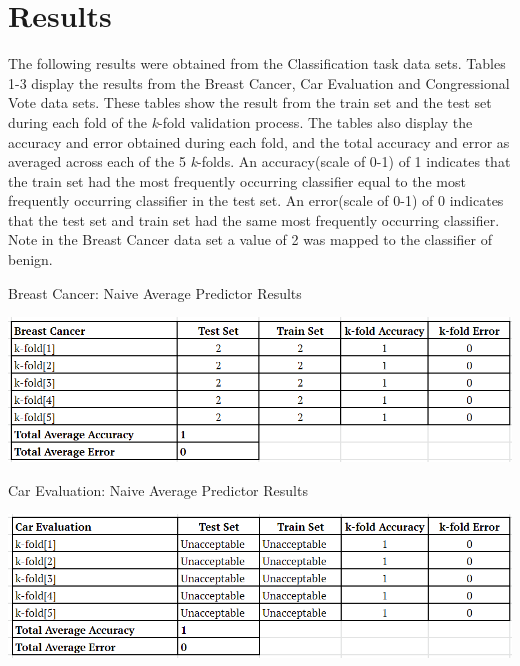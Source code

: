 \documentclass[twoside,11pt]{article}
\begin{document}
\newpage

\section{Results}
The following results were obtained from the Classification task data sets.
Tables 1-3 display the results from the Breast Cancer, Car Evaluation and Congressional Vote data sets. These tables show the result from the train set and the test set during each fold of the \textit{k}-fold validation process. The tables also display the accuracy and error obtained during each fold, and the total accuracy and error as averaged across each of the 5 \textit{k}-folds. An accuracy(scale of 0-1) of 1 indicates that the train set had the most frequently occurring classifier equal to the most frequently occurring classifier in the test set. An error(scale of 0-1) of 0 indicates that the test set and train set had the same most frequently occurring classifier. Note in the Breast Cancer data set a value of 2 was mapped to the classifier of benign.\\ 

\begin{table}[h!]
	\begin{center}
		\caption{Breast Cancer: Naive Average Predictor Results}
		\label{tab:table4}
		\includegraphics[scale=.6]{BC_Results}\newline
	\end{center}
\end{table}

\begin{table}[h!]
	\begin{center}
		\caption{Car Evaluation: Naive Average Predictor Results}
		\label{tab:table5}
		\includegraphics[scale=.6]{CE_Results}\newline
	\end{center}
\end{table}
\end{document}
